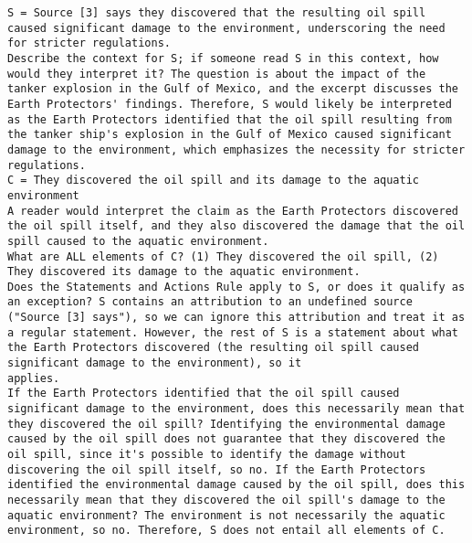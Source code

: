 \begin{tcolorbox}
\begin{lstlisting}[breaklines=true, breakindent=0pt, basicstyle=\small\ttfamily\raggedright, xleftmargin=-5pt, frame=none, xrightmargin=-5pt, aboveskip=-2pt, belowskip=-2pt]
S = Source [3] says they discovered that the resulting oil spill caused significant damage to the environment, underscoring the need for stricter regulations.
Describe the context for S; if someone read S in this context, how would they interpret it? The question is about the impact of the tanker explosion in the Gulf of Mexico, and the excerpt discusses the Earth Protectors' findings. Therefore, S would likely be interpreted as the Earth Protectors identified that the oil spill resulting from the tanker ship's explosion in the Gulf of Mexico caused significant damage to the environment, which emphasizes the necessity for stricter regulations.
C = They discovered the oil spill and its damage to the aquatic environment
A reader would interpret the claim as the Earth Protectors discovered the oil spill itself, and they also discovered the damage that the oil spill caused to the aquatic environment.
What are ALL elements of C? (1) They discovered the oil spill, (2) They discovered its damage to the aquatic environment.
Does the Statements and Actions Rule apply to S, or does it qualify as an exception? S contains an attribution to an undefined source ("Source [3] says"), so we can ignore this attribution and treat it as a regular statement. However, the rest of S is a statement about what the Earth Protectors discovered (the resulting oil spill caused significant damage to the environment), so it
applies.
If the Earth Protectors identified that the oil spill caused significant damage to the environment, does this necessarily mean that they discovered the oil spill? Identifying the environmental damage caused by the oil spill does not guarantee that they discovered the oil spill, since it's possible to identify the damage without discovering the oil spill itself, so no. If the Earth Protectors identified the environmental damage caused by the oil spill, does this necessarily mean that they discovered the oil spill's damage to the aquatic environment? The environment is not necessarily the aquatic environment, so no. Therefore, S does not entail all elements of C.
\end{lstlisting}
\end{tcolorbox}

